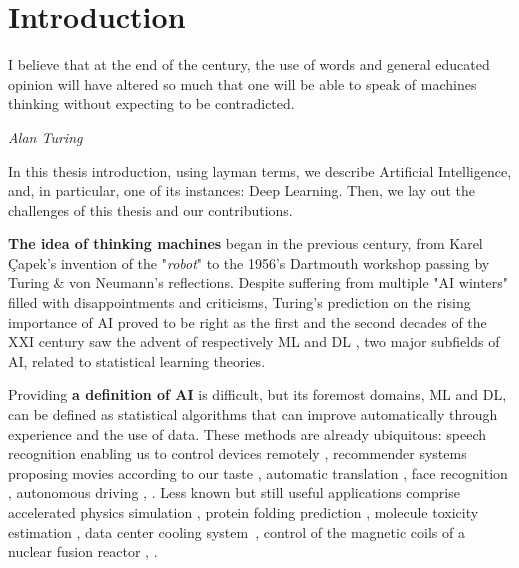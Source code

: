 \chapter{Introduction}
\label{chapter:introduction}

{}





\epigraph{I believe that at the end of the century, the use of words and general educated opinion
      will have altered so much that one will be able to speak of machines thinking without expecting to
      be contradicted.}{\textit{Alan Turing}}

In this thesis introduction, using layman terms, we describe Artificial Intelligence, and,
in particular, one of its instances: Deep Learning. Then, we lay out the challenges of this
thesis and our contributions.


\textbf{The idea of thinking machines} began in the previous century, from Karel Çapek's invention
of the "\textit{robot}" to the 1956's Dartmouth workshop passing by Turing \& von Neumann's
reflections. Despite suffering from multiple "AI winters" filled with disappointments and
criticisms, Turing's prediction on the rising importance of \ac{AI} proved to be right as the first
and the second decades of the XXI century saw the advent of respectively \acf{ML}
\citep{bishop2006prml} and \acf{DL} \citep{goodfellow2016deeplearningbook}, two major subfields of
\ac{AI}, related to statistical learning theories.

Providing \textbf{a definition of \ac{AI}} is difficult, but its foremost domains, \ac{ML} and
\ac{DL}, can be defined as statistical algorithms that can improve automatically through experience
and the use of data. These methods are already ubiquitous: speech recognition enabling us to control
devices remotely \citep{amodei2016deepspeech2}, recommender systems proposing movies according to
our taste \citep{toscher2009netflixprize}, automatic translation \citep{vaswani2017transformer},
face recognition \citep{schroff2015facenet}, autonomous driving \citep{sun2020waymodataset}, \etc.
Less known but still useful applications comprise accelerated physics simulation
\citep{breen2020threebody}, protein folding prediction \citep{jumper2021alphafold}, molecule
toxicity estimation \citep{nih2019toxchallenge}, data center cooling
system \citep{evans2016datacentercooling}, control of the magnetic coils of a nuclear fusion reactor
\citep{degrave2022nuclearreactor}, \etc.

